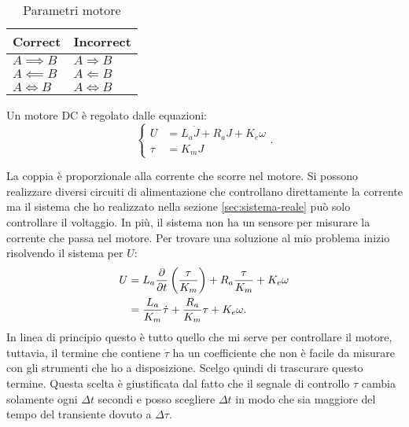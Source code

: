 \begin{table}[htbp]
    \centering
    \begin{tabular}{@{}ll@{}}
        \toprule
        \textbf{Correct}     & \textbf{Incorrect}         \\
        \midrule
        \( A \implies B \)   & \( A \Rightarrow B \)      \\
        \( A \impliedby B \) & \( A \Leftarrow B \)       \\
        \( A \iff B \)       & \( A \Leftrightarrow B \)  \\
        \bottomrule
    \end{tabular}
    \caption[Parametri motore]{Parametri motore}
    \label{tab:parametri-motore}
\end{table}


Un motore DC è regolato dalle equazioni: 
\begin{equation*}
    \left\{ 
        \begin{aligned}
            U &= L_a \dot J + R_a J + K_e \omega \\
            \tau &= K_m J
        \end{aligned}
    \right.
    .
\end{equation*}

La coppia è proporzionale alla corrente che scorre nel motore. Si possono realizzare diversi circuiti di alimentazione che controllano direttamente la corrente ma il sistema che ho realizzato nella sezione \ref{sec:sistema-reale} può solo controllare il voltaggio. In più, il sistema non ha un sensore per misurare la corrente che passa nel motore.
Per trovare una soluzione al mio problema inizio risolvendo il sistema per $U$:
\begin{equation*}
    \begin{aligned}
    U &= L_a \frac \partial {\partial t} \left(\frac \tau {K_m}\right) + R_a \frac \tau {K_m} + K_e \omega \\
      &= \frac {L_a} {K_m} \dot\tau + \frac{R_a}{K_m}  \tau + K_e \omega.
    \end{aligned}
\end{equation*}
In linea di principio questo è tutto quello che mi serve per controllare il motore, tuttavia, il termine che contiene $\dot \tau$ ha un coefficiente che non è facile da misurare con gli strumenti che ho a disposizione. Scelgo quindi di trascurare questo termine. Questa scelta è giustificata dal fatto che il segnale di controllo $\tau$ cambia solamente ogni $\Delta t$ secondi e posso scegliere $\Delta t$ in modo che sia maggiore del tempo del transiente dovuto a $\Delta \tau$.

